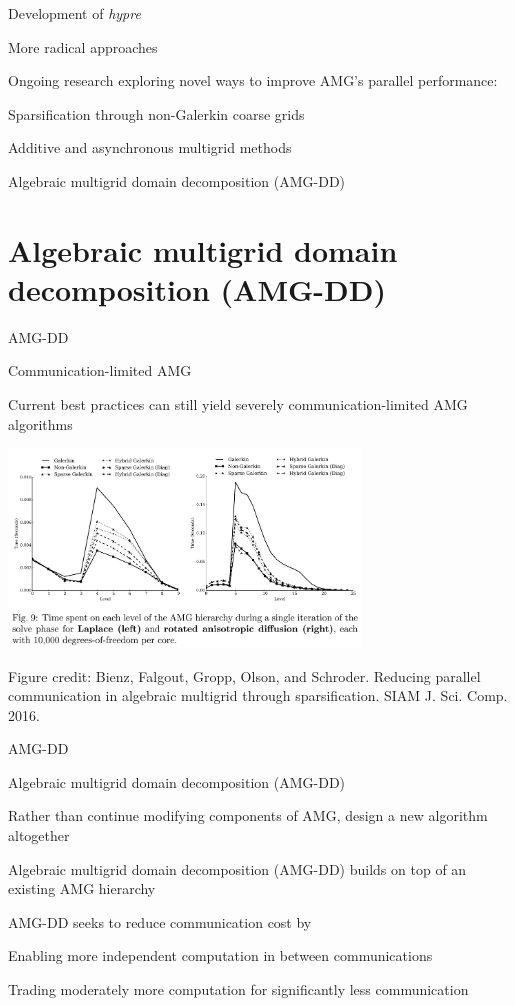\documentclass[18pt,xcolor=table]{beamer}
\begin{document}
\begin{frame}{Development of \emph{hypre}}
\begin{block}{More radical approaches}
\bit
\item Ongoing research exploring novel ways to improve AMG's parallel performance:
\bit
\item Sparsification through non-Galerkin coarse grids
\item Additive and asynchronous multigrid methods
\item Algebraic multigrid domain decomposition (AMG-DD)
\eit
\eit
\end{block}
\end{frame}



\section{Algebraic multigrid domain decomposition (AMG-DD)}

\begin{frame}{AMG-DD}
\begin{block}{Communication-limited AMG}
\bit
\item Current best practices can still yield severely communication-limited AMG algorithms
\eit
\end{block}
\begin{center}
\includegraphics[width=0.7\textwidth]{../figures/nonGalerkinFigure}
\end{center}
\tiny{Figure credit: Bienz, Falgout, Gropp, Olson, and Schroder. Reducing parallel communication in algebraic multigrid through sparsification. SIAM J. Sci. Comp. 2016.}
\end{frame}

\begin{frame}{AMG-DD}
\begin{block}{Algebraic multigrid domain decomposition (AMG-DD)}
\bit
\item Rather than continue modifying components of AMG, design a new algorithm altogether
\item Algebraic multigrid domain decomposition (AMG-DD) builds on top of an existing AMG hierarchy
\item AMG-DD seeks to reduce communication cost by
\bit
\item Enabling more independent computation in between communications
\item Trading moderately more computation for significantly less communication
\eit
\eit
\end{block}
\end{frame}
\end{document}
